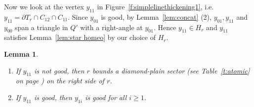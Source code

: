 \documentclass[11pt]{amsart}
\newtheorem{lemma}[theorem]{Lemma}
\theoremstyle{definition}
\begin{document}
Now we look at the vertex $y_{11}$ in Figure~\ref{f:simplelinethickening1}, i.e.\ $y_{11}=\partial T_r\cap C_{12}\cap C_{11}$. Since $y_{01}$ is good, by Lemma~\ref{lem:concat} (2), $y_{01},y_{11}$ and $y_{00}$ span a triangle in $Q'$ with a right-angle at $y_{01}$. Hence $y_{11}\in H_r$ and $y_{11}$ satisfies Lemma~\ref{lem:star homeo} by our choice of $H_r$.

\begin{lemma}\
	\label{lem:producing diamond-plain sector}
	\begin{enumerate}
		\item If $y_{11}$ is not good, then $r$ bounds a diamond-plain sector (see Table~\ref{t:atomic} on page \pageref{t:atomic}) on the right side of $r$.
		\item If $y_{11}$ is good, then $y_{1i}$ is good for all $i\ge 1$.
	\end{enumerate}
\end{lemma}
\end{document}
